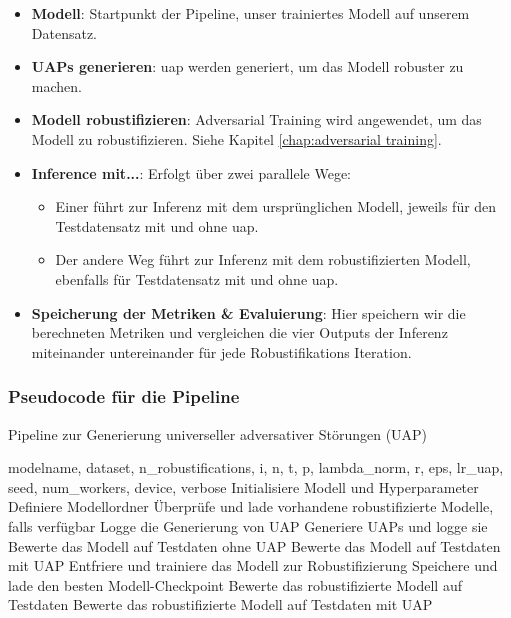 \begin{itemize}
    \item \textbf{Modell}: Startpunkt der Pipeline, unser trainiertes Modell auf unserem Datensatz.
    \item \textbf{UAPs generieren}: \acrshort{uap} werden generiert, um das Modell robuster zu machen.
    \item \textbf{Modell robustifizieren}: Adversarial Training wird angewendet, um das Modell zu robustifizieren. Siehe Kapitel \ref{chap:adversarial training}.
    \item \textbf{Inference mit...}: Erfolgt über zwei parallele Wege:
        \begin{itemize}
            \item Einer führt zur Inferenz mit dem ursprünglichen Modell, jeweils für den Testdatensatz mit und ohne \acrshort{uap}.
            \item Der andere Weg führt zur Inferenz mit dem robustifizierten Modell, ebenfalls für Testdatensatz mit und ohne \acrshort{uap}.
        \end{itemize}
    \item \textbf{Speicherung der Metriken \& Evaluierung}: Hier speichern wir die berechneten Metriken und vergleichen die vier Outputs der Inferenz miteinander untereinander für jede Robustifikations Iteration. 
\end{itemize}

\newpage

\subsubsection{Pseudocode für die Pipeline}

\begin{algorithm}
\caption{Pipeline zur Generierung universeller adversativer Störungen (UAP)}
\label{alg:UAP_Pseudo_Algorithmmus}
\begin{algorithmic}[1]
\REQUIRE modelname, dataset, n\_robustifications, i, n, t, p, lambda\_norm, r, eps, lr\_uap, seed, num\_workers, device, verbose
\STATE Initialisiere Modell und Hyperparameter
    \STATE Definiere Modellordner
    \STATE Überprüfe und lade vorhandene robustifizierte Modelle, falls verfügbar
        \STATE Logge die Generierung von UAP
        \STATE Generiere UAPs und logge sie
        \STATE Bewerte das Modell auf Testdaten ohne UAP
            \STATE Bewerte das Modell auf Testdaten mit UAP
        \ENDFOR
        \STATE Entfriere und trainiere das Modell zur Robustifizierung
        \STATE Speichere und lade den besten Modell-Checkpoint
        \STATE Bewerte das robustifizierte Modell auf Testdaten
            \STATE Bewerte das robustifizierte Modell auf Testdaten mit UAP
        \ENDFOR
    \ENDIF
\ENDFOR
\end{algorithmic}
\end{algorithm}

